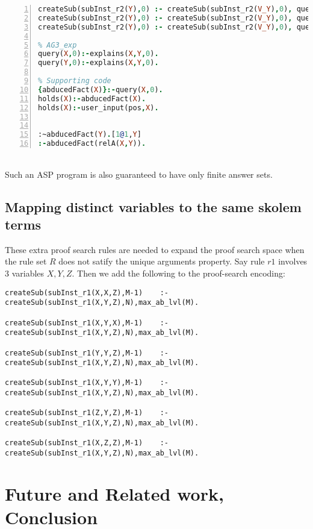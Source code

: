 \documentclass{article}
\begin{document}
\begin{lstlisting}[language=Prolog, numbers=left]
createSub(subInst_r2(Y),0) :- createSub(subInst_r2(V_Y),0), query(relE(Y),0).
createSub(subInst_r2(Y),0) :- createSub(subInst_r2(V_Y),0), query(relD(Y),0).
createSub(subInst_r2(Y),0) :- createSub(subInst_r2(V_Y),0), query(relF(Y),0).

% AG3_exp
query(X,0):-explains(X,Y,0).
query(Y,0):-explains(X,Y,0).

% Supporting code
{abducedFact(X)}:-query(X,0).
holds(X):-abducedFact(X).
holds(X):-user_input(pos,X).


:~abducedFact(Y).[1@1,Y]
:-abducedFact(relA(X,Y)).
\end{lstlisting}\\
Such an ASP program is also guaranteed to have only finite answer sets.
\subsection{Mapping distinct variables to the same skolem terms}
These extra proof search rules are needed to expand the proof search space when the rule set $R$ does not satify the unique arguments property. Say rule $r1$ involves 3 variables $X, Y, Z$. Then we add the following to the proof-search encoding:
\begin{verbatim}
createSub(subInst_r1(X,X,Z),M-1)    :-createSub(subInst_r1(X,Y,Z),N),max_ab_lvl(M).

createSub(subInst_r1(X,Y,X),M-1)    :-createSub(subInst_r1(X,Y,Z),N),max_ab_lvl(M).

createSub(subInst_r1(Y,Y,Z),M-1)    :-createSub(subInst_r1(X,Y,Z),N),max_ab_lvl(M).

createSub(subInst_r1(X,Y,Y),M-1)    :-createSub(subInst_r1(X,Y,Z),N),max_ab_lvl(M).

createSub(subInst_r1(Z,Y,Z),M-1)    :-createSub(subInst_r1(X,Y,Z),N),max_ab_lvl(M).

createSub(subInst_r1(X,Z,Z),M-1)    :-createSub(subInst_r1(X,Y,Z),N),max_ab_lvl(M).
\end{verbatim}

\section{Future and Related work, Conclusion}\label{sec:conclusion}
\end{document}
